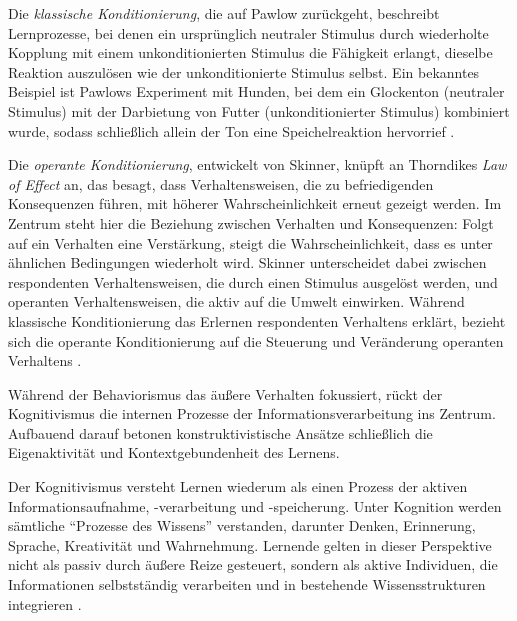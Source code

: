 Die \textit{klassische Konditionierung}, die auf Pawlow zurückgeht, beschreibt Lernprozesse, bei denen ein ursprünglich neutraler Stimulus durch wiederholte Kopplung mit einem unkonditionierten Stimulus die Fähigkeit erlangt, dieselbe Reaktion auszulösen wie der unkonditionierte Stimulus selbst. Ein bekanntes Beispiel ist Pawlows Experiment mit Hunden, bei dem ein Glockenton (neutraler Stimulus) mit der Darbietung von Futter (unkonditionierter Stimulus) kombiniert wurde, sodass schließlich allein der Ton eine Speichelreaktion hervorrief \parencite[S.~7--10]{furstenau_lehr-lern-theorien_2019}.

Die \textit{operante Konditionierung}, entwickelt von Skinner, knüpft an Thorndikes \textit{Law of Effect} an, das besagt, dass Verhaltensweisen, die zu befriedigenden Konsequenzen führen, mit höherer Wahrscheinlichkeit erneut gezeigt werden. Im Zentrum steht hier die Beziehung zwischen Verhalten und Konsequenzen: Folgt auf ein Verhalten eine Verstärkung, steigt die Wahrscheinlichkeit, dass es unter ähnlichen Bedingungen wiederholt wird. Skinner unterscheidet dabei zwischen respondenten Verhaltensweisen, die durch einen Stimulus ausgelöst werden, und operanten Verhaltensweisen, die aktiv auf die Umwelt einwirken. Während klassische Konditionierung das Erlernen respondenten Verhaltens erklärt, bezieht sich die operante Konditionierung auf die Steuerung und Veränderung operanten Verhaltens \parencite[S.~15--17]{furstenau_lehr-lern-theorien_2019}.

Während der Behaviorismus das äußere Verhalten fokussiert, rückt der Kognitivismus die internen Prozesse der Informationsverarbeitung ins Zentrum. Aufbauend darauf betonen konstruktivistische Ansätze schließlich die Eigenaktivität und Kontextgebundenheit des Lernens.

Der Kognitivismus versteht Lernen wiederum als einen Prozess der aktiven Informationsaufnahme, -verarbeitung und -speicherung. Unter Kognition werden sämtliche \enquote{Prozesse des Wissens} verstanden, darunter Denken, Erinnerung, Sprache, Kreativität und Wahrnehmung. Lernende gelten in dieser Perspektive nicht als passiv durch äußere Reize gesteuert, sondern als aktive Individuen, die Informationen selbstständig verarbeiten und in bestehende Wissensstrukturen integrieren \parencite[S.~1]{furstenau_lehr-lern-theorien_2019}.


